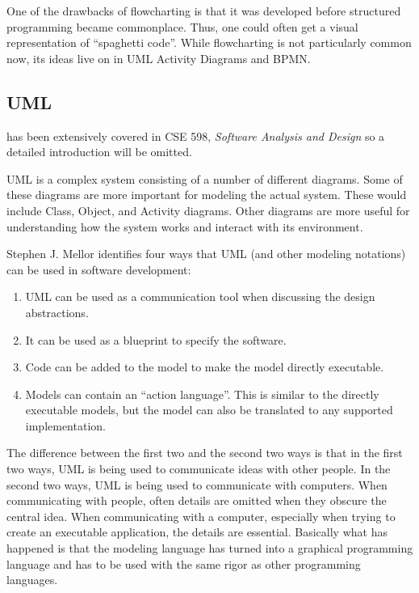 \documentclass[10pt,journal,letterpaper,compsoc]{IEEEtran}
\begin{document}
One of the drawbacks of flowcharting is that it was developed before structured programming became commonplace.  Thus, one could often get a visual representation of ``spaghetti code''.  While flowcharting is not particularly common now, its ideas live on in UML Activity Diagrams and BPMN\cite{White2004}.

\subsection{UML}
 has been extensively covered in CSE 598, \emph{Software Analysis and Design} so a detailed introduction  will be omitted.

UML is a complex system consisting of a number of different diagrams\cite{UML-REF1999}.  Some of these diagrams are more important for modeling the actual system.  These would include Class, Object, and Activity diagrams.  Other diagrams are more useful for understanding how the system works and interact with its environment.

Stephen J. Mellor identifies four ways that UML (and other modeling notations) can be used in software development\cite{Mellor2007}:
\begin{enumerate}
  \item UML can be used as a communication tool when discussing the design abstractions.
  \item It can be used as a blueprint to specify the software.
  \item Code can be added to the model to make the model directly executable.
  \item Models can contain an ``action language''.  This is similar to the directly executable models, but the model can also be translated to any supported implementation.
\end{enumerate}

The difference between the first two and the second two ways is that in the first two ways, UML is being used to communicate ideas with other people.  In the second two ways, UML is being used to communicate with computers.  When communicating with people, often details are omitted when they obscure the central idea.  When communicating with a computer, especially when trying to create an executable application, the details are essential.  Basically what has happened is that the modeling language has turned into a graphical programming language and has to be used with the same rigor as other programming languages.
\end{document}
